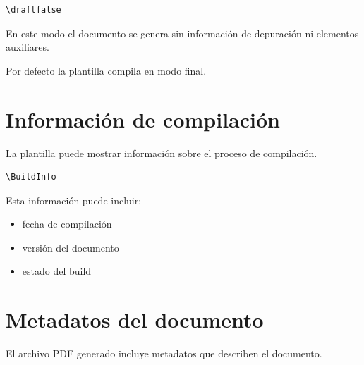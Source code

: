 \begin{lstlisting}[caption={Modo final},label={code:finalmode}]
\draftfalse
\end{lstlisting}




En este modo el documento se genera sin información
de depuración ni elementos auxiliares.



\begin{notebox}
Por defecto la plantilla compila en modo final.
\end{notebox}




\section{Información de compilación}

La plantilla puede mostrar información sobre el
proceso de compilación.

\begin{lstlisting}[caption={Macro de información de build},label={code:buildinfo}]
\BuildInfo
\end{lstlisting}




Esta información puede incluir:

\begin{itemize}

\item fecha de compilación
\item versión del documento
\item estado del build

\end{itemize}




\section{Metadatos del documento}

El archivo PDF generado incluye metadatos que
describen el documento.


